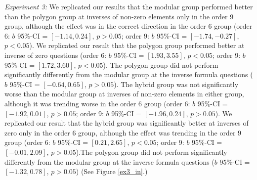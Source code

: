 \documentclass[man,10pt]{apa6}
\begin{document}
\textit{Experiment 3:} We replicated our results that the modular group performed better than the polygon group at inverses of non-zero elements only in the order 9 group, although the effect was in the correct direction in the order 6 group (order 6: $b$ 95\%-CI = $[-1.14,0.24]$, $p > 0.05$; order 9: $b$ 95\%-CI = $[-1.74,-0.27]$, $p < 0.05$). We replicated our result that the polygon group performed better at inverse of zero questions (order 6: $b$ 95\%-CI = $[1.93,3.55]$, $p < 0.05$; order 9: $b$ 95\%-CI = $[1.72,3.60]$, $p < 0.05$). The polygon group did not perform significantly differently from the modular group at the inverse formula questions ($b$ 95\%-CI = $[-0.64,0.65]$, $p > 0.05$). The hybrid group was not significantly worse than the modular group at inverses of non-zero elements in either group, although it was trending worse in the order 6 group (order 6: $b$ 95\%-CI = $[-1.92,0.01]$, $p > 0.05$; order 9: $b$ 95\%-CI = $[-1.96,0.24]$, $p > 0.05$). We replicated our result that the hybrid group was significantly better at inverses of zero only in the order 6 group, although the effect was trending in the order 9 group (order 6: $b$ 95\%-CI = $[0.21,2.65]$, $p < 0.05$; order 9: $b$ 95\%-CI = $[-0.01,2.09]$, $p > 0.05$).The polygon group did not perform significantly differently from the modular group at the inverse formula questions ($b$ 95\%-CI = $[-1.32,0.78]$, $p > 0.05$) (See Figure \ref{ex3_in}.) \par
\end{document}
